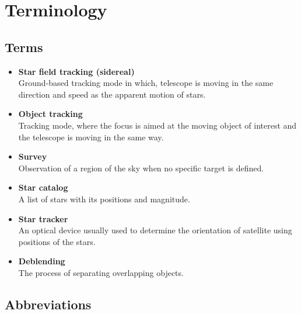 \chapter*{Terminology}

\section*{Terms}

\begin{itemize}
    \setlength\itemsep{1px}
    \item \textbf{Star field tracking (sidereal)} \\
    Ground-based tracking mode in which, telescope is moving in the same direction and speed as the apparent motion of stars.
    
    \item \textbf{Object tracking} \\
    Tracking mode, where the focus is aimed at the moving object of interest and the telescope is moving in the same way. 

    \item \textbf{Survey} \\
    Observation of a region of the sky when no specific target is defined. 

    \item \textbf{Star catalog} \\
    A list of stars with its positions and magnitude. 

    \item \textbf{Star tracker} \\
    An optical device usually used to determine the orientation of satellite using positions of the stars. 
    
    \item \textbf{Deblending} \\
    The process of separating overlapping objects.
    
\end{itemize}

\section*{Abbreviations}

